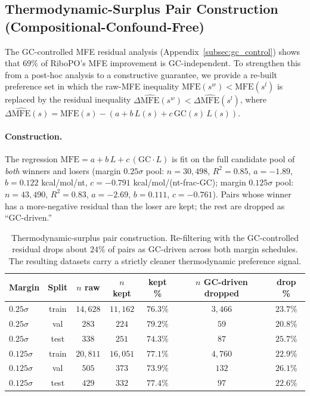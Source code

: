 {{%
\subsection{Thermodynamic-Surplus Pair Construction (Compositional-Confound-Free)}
\label{app:thermo_surplus}

The GC-controlled MFE residual analysis (Appendix~\ref{subsec:gc_control}) shows that $69\%$ of RiboPO's MFE improvement is GC-independent. To strengthen this from a post-hoc analysis to a constructive guarantee, we provide a re-built preference set in which the raw-MFE inequality $\mathrm{MFE}(s^w) < \mathrm{MFE}(s^l)$ is replaced by the residual inequality $\Delta\widehat{\mathrm{MFE}}(s^w) < \Delta\widehat{\mathrm{MFE}}(s^l)$, where $\Delta\widehat{\mathrm{MFE}}(s) = \mathrm{MFE}(s) - (a + b\,L(s) + c\,\mathrm{GC}(s)\,L(s))$.

\paragraph{Construction.}
The regression $\mathrm{MFE} = a + b\,L + c\,(\mathrm{GC}\!\cdot\!L)$ is fit on the full candidate pool of \emph{both} winners and losers (margin $0.25\sigma$ pool: $n=30{,}498$, $R^2 = 0.85$, $a=-1.89$, $b=0.122$ kcal/mol/nt, $c=-0.791$ kcal/mol/(nt-frac-GC); margin $0.125\sigma$ pool: $n=43{,}490$, $R^2=0.83$, $a=-2.69$, $b=0.111$, $c=-0.761$). Pairs whose winner has a more-negative residual than the loser are kept; the rest are dropped as ``GC-driven.''

\begin{table}[h]
\centering
\caption{Thermodynamic-surplus pair construction. Re-filtering with the GC-controlled residual drops about $24\%$ of pairs as GC-driven across both margin schedules. The resulting datasets carry a strictly cleaner thermodynamic preference signal.}
\label{tab:thermo_surplus_filter}
\small
\begin{tabular}{lcccccc}
\toprule
\textbf{Margin} & \textbf{Split} & \textbf{$n$ raw} & \textbf{$n$ kept} & \textbf{kept \%} & \textbf{$n$ GC-driven dropped} & \textbf{drop \%} \\
\midrule
$0.25\sigma$  & train & $14{,}628$ & $11{,}162$ & $76.3\%$ & $3{,}466$ & $23.7\%$ \\
$0.25\sigma$  & val   & $283$      & $224$      & $79.2\%$ & $59$      & $20.8\%$ \\
$0.25\sigma$  & test  & $338$      & $251$      & $74.3\%$ & $87$      & $25.7\%$ \\
$0.125\sigma$ & train & $20{,}811$ & $16{,}051$ & $77.1\%$ & $4{,}760$ & $22.9\%$ \\
$0.125\sigma$ & val   & $505$      & $373$      & $73.9\%$ & $132$     & $26.1\%$ \\
$0.125\sigma$ & test  & $429$      & $332$      & $77.4\%$ & $97$      & $22.6\%$ \\
\bottomrule
\end{tabular}
\end{table}

}}
